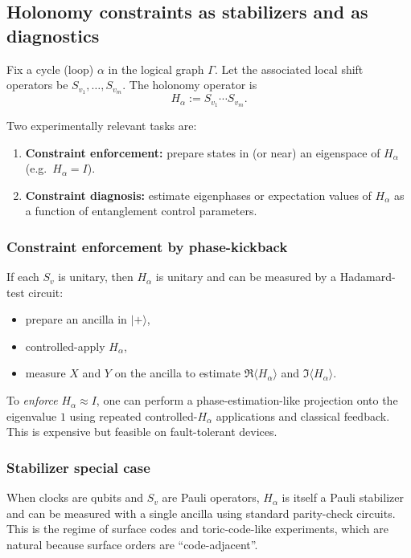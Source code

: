 \documentclass[11pt,oneside]{amsbook}
\numberwithin{equation}{section}
\theoremstyle{plain}
\theoremstyle{definition}
\theoremstyle{remark}
\begin{document}
\subsection{Holonomy constraints as stabilizers and as diagnostics}
\label{sec:holonomy_constraints}

Fix a cycle (loop) $\alpha$ in the logical graph $\Gamma$.
Let the associated local shift operators be $S_{v_1},\dots,S_{v_m}$.
The holonomy operator is
\[
H_\alpha:=S_{v_1}\cdots S_{v_m}.
\]

Two experimentally relevant tasks are:
\begin{enumerate}
\item \textbf{Constraint enforcement:} prepare states in (or near) an eigenspace of $H_\alpha$ (e.g.\ $H_\alpha=I$).
\item \textbf{Constraint diagnosis:} estimate eigenphases or expectation values of $H_\alpha$ as a function of entanglement control parameters.
\end{enumerate}

\subsubsection{Constraint enforcement by phase-kickback}
If each $S_v$ is unitary, then $H_\alpha$ is unitary and can be measured by a Hadamard-test circuit:
\begin{itemize}
\item prepare an ancilla in $|+\rangle$,
\item controlled-apply $H_\alpha$,
\item measure $X$ and $Y$ on the ancilla to estimate $\Re\langle H_\alpha\rangle$ and $\Im\langle H_\alpha\rangle$.
\end{itemize}

To \emph{enforce} $H_\alpha\approx I$, one can perform a phase-estimation-like projection onto the eigenvalue $1$ using repeated controlled-$H_\alpha$ applications and classical feedback.
This is expensive but feasible on fault-tolerant devices.

\subsubsection{Stabilizer special case}
When clocks are qubits and $S_v$ are Pauli operators, $H_\alpha$ is itself a Pauli stabilizer and can be measured with a single ancilla using standard parity-check circuits.
This is the regime of surface codes and toric-code-like experiments, which are natural because surface orders are ``code-adjacent''.
\end{document}
